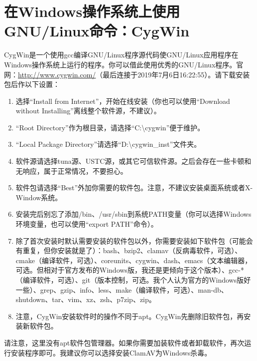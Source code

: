 \section{在Windows操作系统上使用GNU/Linux命令：CygWin}
CygWin是一个使用gcc编译GNU/Linux程序源代码使GNU/Linux应用程序在Windows操作系统上运行的程序。你可以借此使用优秀的GNU/Linux程序。官网：\url{http://www.cygwin.com/}（最后连接于2019年7月6日16:22:55）。请下载安装包后作以下设置：
\begin{enumerate}
\item 选择“Install from Internet”，开始在线安装（你也可以使用“Download without Installing”离线整个软件源，不建议）。
\item “Root Directory”作为根目录，请选择“C:\textbackslash cygwin”便于维护。
\item “Local Package Directory”请选择“D:\textbackslash cygwin\_inst”文件夹。
\item 软件源请选择tuna源、USTC源，或其它可信软件源。之后会存在一些卡顿和无响应，属于正常情况，不要担心。
\item 软件包请选择“Best”外加你需要的软件包。注意，不建议安装桌面系统或者X-Window系统。
\item 安装完后别忘了添加/bin、/usr/sbin到系统PATH变量（你可以选择Windows环境变量，也可以使用“export PATH”命令）。 
\item 除了首次安装时默认需要安装的软件包以外，你需要安装如下软件包（可能会有重复，但你安装就是了）：bash、bzip2、clamav（反病毒软件，可选）、cmake（编译软件，可选）、coreunits、cygwin、dash、emacs（文本编辑器，可选。但相对于官方发布的Windows版，我还是更倾向于这个版本）、gcc-*（编译软件，可选）、git（版本控制，可选。我个人认为官方的Windows版好一些）、grep、gzip、info、less、make（编译软件，可选）、man-db、shutdown、tar、vim、xz、zsh、p7zip、zip。
\item 注意，CygWin安装软件时的操作不同于apt。CygWin先删除旧软件包，再安装新软件包。
\end{enumerate}
请注意，这里没有apt软件包管理器。如果你需要加装软件或者卸载软件，再次运行安装程序即可。我建议你可以选择安装ClamAV为Windows杀毒。
